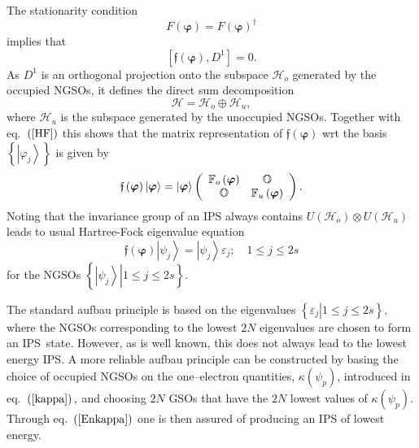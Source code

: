 \documentclass[aps,preprint]{revtex4}%
\begin{document}
The stationarity condition
\begin{equation}
F\left(  \bm{\varphi}\right)  =F\left(  \bm{\varphi}\right)  ^{\dagger}%
\end{equation}
implies that
\begin{equation}
\left[  \mathfrak{f}\left(  \bm{\varphi}\right)  ,D^{1}\right]  =0. \label{HF}%
\end{equation}
As $D^{1}$ is an orthogonal projection onto the subspace $\mathcal{H}_{o}$
generated by the occupied NGSOs, it defines the direct sum decomposition
\begin{equation}
\mathcal{H=H}_{o}\oplus\mathcal{H}_{u}, \label{DS}%
\end{equation}
where $\mathcal{H}_{u}$ is the subspace generated by the unoccupied NGSOs.
Together with eq.\ $\left(  \ref{HF}\right)  $ this shows that the matrix
representation of $\mathfrak{f}\left(  \bm{\varphi}\right)  $ wrt the basis
$\left\{  \left\vert \varphi_{j}\right\rangle \right\}  $ is given by
\begin{equation}
\mathfrak{f}\left(  \bm{\varphi}\right)  \left\vert \bm{\varphi }\right\rangle
=\left\vert \bm{\varphi}\right\rangle \left(
\begin{array}
[c]{cc}%
\mathbb{F}_{o}\left(  \bm{\varphi}\right)  & \mathbb{O}\\
\mathbb{O} & \mathbb{F}_{u}\left(  \bm{\varphi}\right)
\end{array}
\right)  .
\end{equation}
Noting that the invariance group of an IPS always contains $U\left(
\mathcal{H}_{o}\right)  \otimes U\left(  \mathcal{H}_{u}\right)  $ leads to
usual Hartree-Fock eigenvalue equation
\begin{equation}
\mathfrak{f}\left(  \bm{\varphi}\right)  \left\vert \psi_{j}\right\rangle
=\left\vert \psi_{j}\right\rangle \varepsilon_{j};\quad1\leq j\leq2s
\end{equation}
for the NGSOs $\left\{  \left.  \left\vert \psi_{j}\right\rangle \right\vert
1\leq j\leq2s\right\}  $.

The standard aufbau principle is based on the eigenvalues $\left\{  \left.
\varepsilon_{j}\right\vert 1\leq j\leq2s\right\}  ,$ where the NGSOs
corresponding to the lowest $2N$ eigenvalues are chosen to form an IPS\ state.
However, as is well known, this does not always lead to the lowest energy IPS.
A more reliable aufbau principle can be constructed by basing the choice of
occupied NGSOs on the one--electron quantities, $\kappa\left(  \psi
_{p}\right)  $, introduced in eq.\ $\left(  \ref{kappa}\right)  ,$ and
choosing $2N$ GSOs that have the $2N$ lowest values of $\kappa\left(  \psi
_{p}\right)  $. Through eq.\ $\left(  \ref{Enkappa}\right)  $ one is then
assured of producing an IPS of lowest energy.
\end{document}
